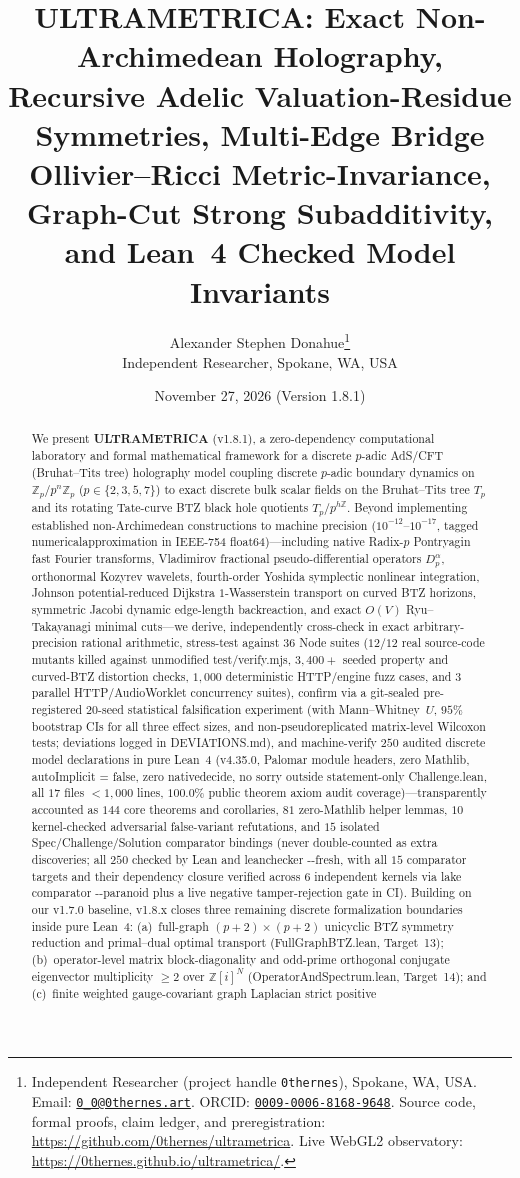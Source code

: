 \documentclass[11pt,a4paper]{article}
\title{\Large\bfseries ULTRAMETRICA: Exact Non-Archimedean Holography, Recursive Adelic Valuation-Residue Symmetries, Multi-Edge Bridge Ollivier--Ricci Metric-Invariance, Graph-Cut Strong Subadditivity, and Lean~4 Checked Model Invariants}
\author{
  Alexander Stephen Donahue\thanks{Independent Researcher (project handle \texttt{0thernes}), Spokane, WA, USA. Email: \href{mailto:0_0@0thernes.art}{\texttt{0\_0@0thernes.art}}. ORCID: \href{https://orcid.org/0009-0006-8168-9648}{\texttt{0009-0006-8168-9648}}. Source code, formal proofs, claim ledger, and preregistration: \url{https://github.com/0thernes/ultrametrica}. Live WebGL2 observatory: \url{https://0thernes.github.io/ultrametrica/}.}\\[0.35em]
  \normalsize Independent Researcher, Spokane, WA, USA
}
\date{November 27, 2026 (Version 1.8.1)}
\numberwithin{equation}{section}
\theoremstyle{plain}
\theoremstyle{definition}
\theoremstyle{remark}
\newcommand{\Z}{\mathbb{Z}}
\newcommand{\Zp}{\mathbb{Z}_p}
\newcommand{\Tp}{T_p}
\newcommand{\Dp}{D_p^\alpha}
\newcommand{\code}[1]{{\ttfamily\footnotesize\def\_{\textunderscore\penalty0\hskip0pt}#1}}
\begin{document}
\maketitle

\begin{abstract}
We present \textbf{ULTRAMETRICA} (\code{v1.8.1}), a zero-dependency computational laboratory and formal mathematical framework for a discrete $p$-adic AdS/CFT (Bruhat--Tits tree) holography model coupling discrete $p$-adic boundary dynamics on $\Zp / p^n \Zp$ ($p \in \{2,3,5,7\}$) to exact discrete bulk scalar fields on the Bruhat--Tits tree $\Tp$ and its rotating Tate-curve BTZ black hole quotients $\Tp / p^{h\Z}$. Beyond implementing established non-Archimedean constructions to machine precision ($10^{-12}$--$10^{-17}$, tagged \code{numerical\_\allowbreak approximation} in IEEE-754 float64)---including native Radix-$p$ Pontryagin fast Fourier transforms, Vladimirov fractional pseudo-differential operators $\Dp$, orthonormal Kozyrev wavelets, fourth-order Yoshida symplectic nonlinear integration, Johnson potential-reduced Dijkstra $1$-Wasserstein transport on curved BTZ horizons, symmetric Jacobi dynamic edge-length backreaction, and exact $O(V)$ Ryu--Takayanagi minimal cuts---we derive, independently cross-check in exact arbitrary-precision rational arithmetic, stress-test against $36$ Node suites ($12/12$ real source-code mutants killed against unmodified \code{test/\allowbreak verify.mjs}, $3{,}400+$ seeded property and curved-BTZ distortion checks, $1{,}000$ deterministic HTTP/engine fuzz cases, and $3$ parallel HTTP/\code{AudioWorklet} concurrency suites), confirm via a git-sealed pre-registered $20$-seed statistical falsification experiment (with Mann--Whitney~$U$, $95\%$ bootstrap CIs for all three effect sizes, and non-pseudoreplicated matrix-level Wilcoxon tests; deviations logged in \code{DEVIATIONS.md}), and machine-verify $250$ audited discrete model declarations in pure Lean~4 (\code{v4.35.0}, Palomar \code{module} headers, zero Mathlib, \code{autoImplicit = false}, zero \code{native\_\allowbreak decide}, no \code{sorry} outside statement-only \code{Challenge.lean}, all $17$ files $< 1{,}000$ lines, $100.0\%$ public theorem axiom audit coverage)---transparently accounted as $144$ core theorems and corollaries, $81$ zero-Mathlib helper lemmas, $10$ kernel-checked adversarial false-variant refutations, and $15$ isolated \code{Spec}/\code{Challenge}/\code{Solution} comparator bindings (never double-counted as extra discoveries; all $250$ checked by Lean and \code{leanchecker {-}{-}fresh}, with all $15$ comparator targets and their dependency closure verified across $6$ independent kernels via \code{lake comparator {-}{-}paranoid} plus a live negative tamper-rejection gate in CI). Building on our \code{v1.7.0} baseline, \code{v1.8.x} closes three remaining discrete formalization boundaries inside pure Lean~4: (a)~full-graph $(p+2)\times(p+2)$ unicyclic BTZ symmetry reduction and primal--dual optimal transport (\code{FullGraphBTZ.lean}, Target~13); (b)~operator-level matrix block-diagonality and odd-prime orthogonal conjugate eigenvector multiplicity $\ge 2$ over $\Z[i]^N$ (\code{OperatorAndSpectrum.lean}, Target~14); and (c)~finite weighted gauge-covariant graph Laplacian strict positive 
\end{abstract}
\end{document}
